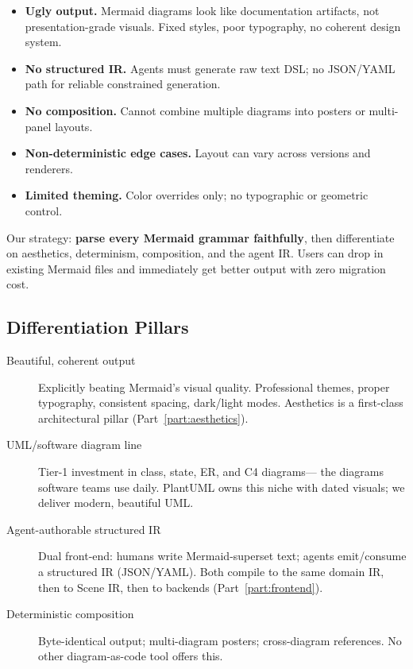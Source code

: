 \begin{itemize}
  \item \textbf{Ugly output.} Mermaid diagrams look like documentation artifacts, not
        presentation-grade visuals. Fixed styles, poor typography, no coherent design system.
  \item \textbf{No structured IR.} Agents must generate raw text DSL; no JSON/YAML path
        for reliable constrained generation.
  \item \textbf{No composition.} Cannot combine multiple diagrams into posters or multi-panel layouts.
  \item \textbf{Non-deterministic edge cases.} Layout can vary across versions and renderers.
  \item \textbf{Limited theming.} Color overrides only; no typographic or geometric control.
\end{itemize}

Our strategy: \textbf{parse every Mermaid grammar faithfully}, then differentiate on
aesthetics, determinism, composition, and the agent IR. Users can drop in existing Mermaid
files and immediately get better output with zero migration cost.

\subsection{Differentiation Pillars}

\begin{description}
  \item[Beautiful, coherent output] Explicitly beating Mermaid's visual quality.
        Professional themes, proper typography, consistent spacing, dark/light modes.
        Aesthetics is a first-class architectural pillar (Part~\ref{part:aesthetics}).

  \item[UML/software diagram line] Tier-1 investment in class, state, ER, and C4 diagrams---
        the diagrams software teams use daily. PlantUML owns this niche with dated visuals;
        we deliver modern, beautiful UML.

  \item[Agent-authorable structured IR] Dual front-end: humans write
        Mermaid-superset text; agents emit/consume a structured IR (JSON/YAML).
        Both compile to the same domain IR, then to Scene IR, then to backends
        (Part~\ref{part:frontend}).

  \item[Deterministic composition] Byte-identical output; multi-diagram posters;
        cross-diagram references. No other diagram-as-code tool offers this.
\end{description}

